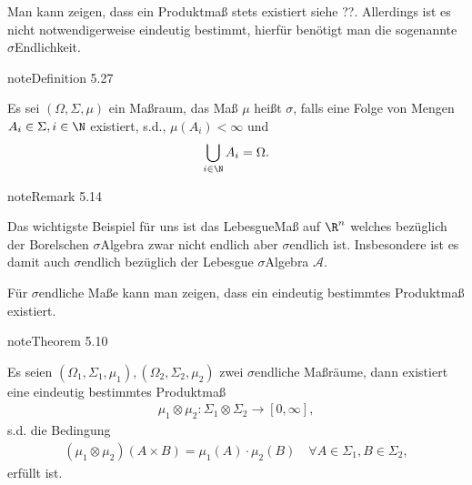 \documentclass[letterpaper,10pt,german]{jupyterBook}
\begin{document}
\sphinxAtStartPar
Man kann zeigen, dass ein Produktmaß stets existiert siehe ??. Allerdings ist es nicht notwendigerweise eindeutig bestimmt, hierfür benötigt man die sogenannte \(\sigma\)\sphinxhyphen{}Endlichkeit.
\label{masstheorie/integrationstechnik:definition-9}
\begin{sphinxadmonition}{note}{Definition 5.27}



\sphinxAtStartPar
Es sei \((\Omega,\Sigma,\mu)\) ein Maßraum, das Maß \(\mu\) heißt \(\sigma\), falls eine Folge von Mengen \(A_i\in\Sigma,i\in\N\) existiert, s.d., \(\mu(A_i)<\infty\) und
\begin{equation*}
\begin{split}\bigcup_{i\in\N} A_i = \Omega.\end{split}
\end{equation*}\end{sphinxadmonition}
\label{masstheorie/integrationstechnik:remark-10}
\begin{sphinxadmonition}{note}{Remark 5.14}



\sphinxAtStartPar
Das wichtigste Beispiel für uns ist das Lebesgue\sphinxhyphen{}Maß auf \(\R^n\) welches bezüglich der Borelschen \(\sigma\)\sphinxhyphen{}Algebra zwar nicht endlich aber \(\sigma\)\sphinxhyphen{}endlich ist. Insbesondere ist es damit auch \(\sigma\)\sphinxhyphen{}endlich bezüglich der Lebesgue \(\sigma\)\sphinxhyphen{}Algebra \(\mathcal{A}\).
\end{sphinxadmonition}

\sphinxAtStartPar
Für \(\sigma\)\sphinxhyphen{}endliche Maße kann man zeigen, dass ein eindeutig bestimmtes Produktmaß existiert.
\label{masstheorie/integrationstechnik:theorem-11}
\begin{sphinxadmonition}{note}{Theorem 5.10}



\sphinxAtStartPar
Es seien \((\Omega_1,\Sigma_1,\mu_1), (\Omega_2,\Sigma_2,\mu_2)\) zwei \(\sigma\)\sphinxhyphen{}endliche Maßräume, dann existiert eine eindeutig bestimmtes Produktmaß
\begin{equation*}
\begin{split}\mu_1\otimes \mu_2:\Sigma_1\otimes\Sigma_2\to[0,\infty],\end{split}
\end{equation*}
\sphinxAtStartPar
s.d. die Bedingung
\begin{equation*}
\begin{split}(\mu_1\otimes\mu_2)(A\times B) = \mu_1(A)\cdot\mu_2(B)\quad\forall A\in\Sigma_1, B\in\Sigma_2,\end{split}
\end{equation*}
\sphinxAtStartPar
erfüllt ist.
\end{sphinxadmonition}
\end{document}
